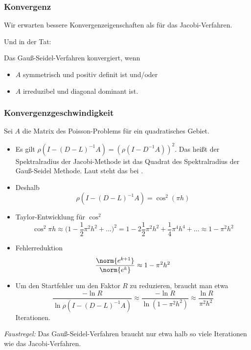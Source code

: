 \subsubsection{Konvergenz}

Wir erwarten bessere Konvergenzeigenschaften als für das Jacobi-Verfahren.

\medskip

Und in der Tat:
\begin{satz}
Das Gauß-Seidel-Verfahren konvergiert, wenn \begin{itemize}
	\item $A$ symmetrisch und positiv definit ist und/oder
	\item $A$ irreduzibel und diagonal dominant ist.
\end{itemize}
\end{satz}
\subsubsection{Konvergenzgeschwindigkeit}
\begin{bsp}
Sei $A$ die Matrix des Poisson-Problems für ein quadratisches Gebiet.
\begin{itemize}
 \item Es gilt $\rho(I-(D-L)^{-1}A) = ( \rho (I-D^{-1}A ) )^2$.
  Das heißt der Spektralradius der Jacobi-Methode ist das Quadrat
  des Spektralradius der Gauß-Seidel Methode.  Laut \citet{dahmen_reusken:2008}
  steht das bei \cite{hackbusch:1994}.

 \item Deshalb
  \begin{equation*}
   \rho(I-(D-L)^{-1}A) = \cos^2(\pi h)
  \end{equation*}

 \item Taylor-Entwicklung für $\cos^2$
  \begin{equation*}
   \cos^2 \pi h
   \approx
   \Big(1-\frac{1}{2} \pi^2h^2+\ldots \Big)^2
   =
   1-2 \frac{1}{2} \pi^2h^2+\frac{1}{4} \pi^4h^4+\ldots \approx 1-\pi^2h^2
  \end{equation*}
 \item Fehlerreduktion
 \begin{equation*}
  \frac{\norm{e^{k+1}}}{\norm{e^k}} \approx 1-\pi^2h^2
 \end{equation*}
 \item Um den Startfehler um den Faktor $R$ zu reduzieren, braucht man etwa
 \begin{equation*}
  \frac{- \ln R}{\ln \rho (I-(D-L)^{-1}A)}
   \approx
  \frac{- \ln R}{\ln \left(1-\pi^2h^2 \right)} \approx \frac{\ln R}{\pi^2h^2}
 \end{equation*}
 Iterationen.
\end{itemize}
\end{bsp}
\emph{Faustregel:} Das Gauß-Seidel-Verfahren braucht nur etwa halb so viele Iterationen wie das Jacobi-Verfahren.

